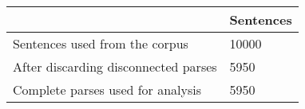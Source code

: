 	\begin{tabular}{|l|l|}
		\hline
	 & Sentences \\ 
		\hline
		Sentences used from the corpus & 10000\\ 
		\hline
		After discarding disconnected parses & 5950\\ 
		\hline
		Complete parses used for analysis & 5950\\ 
		\hline
	\end{tabular}
